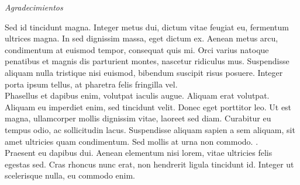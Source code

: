 \documentclass[12pt,spanish, singlespacing,]{MastersDoctoralThesis}
\newcommand\blankpage{%
    \null
    \thispagestyle{empty}%
    \addtocounter{page}{0}%
    \newpage}
\begin{document}
\newpage
\begin{center}
{\huge \textit{Agradecimientos}}\\[1.5cm]
\end{center}

Sed id tincidunt magna. Integer metus dui, dictum vitae feugiat eu, fermentum ultrices magna. In sed dignissim massa, eget dictum ex. Aenean metus arcu, condimentum at euismod tempor, consequat quis mi. Orci varius natoque penatibus et magnis dis parturient montes, nascetur ridiculus mus. Suspendisse aliquam nulla tristique nisi euismod, bibendum suscipit risus posuere. Integer porta ipsum tellus, at pharetra felis fringilla vel. \\

Phasellus et dapibus enim, volutpat iaculis augue. Aliquam erat volutpat. Aliquam eu imperdiet enim, sed tincidunt velit. Donec eget porttitor leo. Ut est magna, ullamcorper mollis dignissim vitae, laoreet sed diam. Curabitur eu tempus odio, ac sollicitudin lacus. Suspendisse aliquam sapien a sem aliquam, sit amet ultricies quam condimentum. Sed mollis at urna non commodo. .\\

Praesent eu dapibus dui. Aenean elementum nisi lorem, vitae ultricies felis egestas sed. Cras rhoncus nunc erat, non hendrerit ligula tincidunt id. Integer ut scelerisque nulla, eu commodo enim. 

\afterpage{\blankpage}


\mainmatter 
\pagestyle{thesis}



$\ $



$\ $

$\ $

$\ $

$\ $

\end{document}
